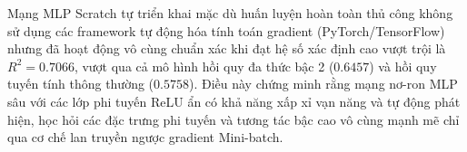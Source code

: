 \documentclass[a4paper]{article}
\begin{document}
Mạng MLP Scratch tự triển khai mặc dù huấn luyện hoàn toàn thủ công không sử dụng các framework tự động hóa tính toán gradient (PyTorch/TensorFlow) nhưng đã hoạt động vô cùng chuẩn xác khi đạt hệ số xác định cao vượt trội là \textbf{$R^2 = 0.7066$}, vượt qua cả mô hình hồi quy đa thức bậc 2 ($0.6457$) và hồi quy tuyến tính thông thường ($0.5758$). Điều này chứng minh rằng mạng nơ-ron MLP sâu với các lớp phi tuyến ReLU ẩn có khả năng xấp xỉ vạn năng và tự động phát hiện, học hỏi các đặc trưng phi tuyến và tương tác bậc cao vô cùng mạnh mẽ chỉ qua cơ chế lan truyền ngược gradient Mini-batch.
\end{document}
